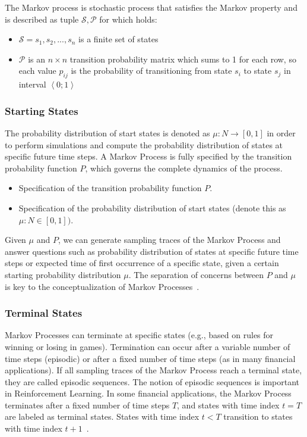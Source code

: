\documentclass[../xlapes02]{subfiles}
\begin{document}
    The Markov process is stochastic process that satisfies the Markov property and is described as tuple $\mathcal{S}, \mathcal{P}$ for which holds:
    \begin{itemize}
        \item $\mathcal{S} = s_1, s_2, ..., s_n$ is a finite set of states
        \item $\mathcal{P}$ is an $n\times n$ transition probability matrix which sums to 1 for each row, so each value $p_{ij}$ is the probability of transitioning from state $s_i$ to state $s_j$ in interval $\left< 0;1 \right>$
    \end{itemize}

    \subsubsection{Starting States}
    The probability distribution of start states is denoted as $\mu : N \rightarrow [0,1]$ in order to perform simulations and compute the probability distribution of states at specific future time steps. A Markov Process is fully specified by the transition probability function $P$, which governs the complete dynamics of the process.
    \begin{itemize}
        \item Specification of the transition probability function $P$.
        \item Specification of the probability distribution of start states (denote this as $\mu : N \in[0, 1])$.
    \end{itemize}
    Given $\mu$ and $P$, we can generate sampling traces of the Markov Process and answer questions such as probability distribution of states at specific future time steps or expected time of first occurrence of a specific state, given a certain starting probability distribution $\mu$. The separation of concerns between $P$ and $\mu$ is key to the conceptualization of Markov Processes~\cite{rao2022foundations}.

    \subsubsection{Terminal States}
    Markov Processes can terminate at specific states (e.g., based on rules for winning or losing in games). Termination can occur after a variable number of time steps (episodic) or after a fixed number of time steps (as in many financial applications). If all sampling traces of the Markov Process reach a terminal state, they are called episodic sequences. The notion of episodic sequences is important in Reinforcement Learning. In some financial applications, the Markov Process terminates after a fixed number of time steps $T$, and states with time index $t = T$ are labeled as terminal states. States with time index $t < T$ transition to states with time index $t + 1$~\cite{rao2022foundations}.
\end{document}
